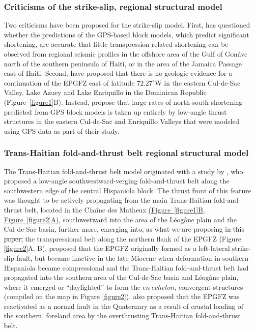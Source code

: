 \documentclass[linenumbers,draft]{agujournal}
\begin{document}
\subsubsection{Criticisms of the strike-slip, regional structural model}
Two criticisms have been proposed for the strike-slip model. First, \citet{corbeau2016transpressive} has questioned whether the predictions of the GPS-based block models, which predict significant shortening, are accurate that little transpression-related shortening can be observed from regional seismic profiles in the offshore area of the Gulf of Gon\^ave north of the southern peninsula of Haiti, or in the area of the Jamaica Passage east of Haiti. Second, \citet{symithe2016present} have proposed that there is no geologic evidence for a continuation of the EPGFZ east of latitude $72.27^{\circ}$W in the eastern Cul-de-Sac Valley, Lake Azuey and Lake Enriquillo in the Dominican Republic (Figure~\ref{figure1}B). Instead, \citet{symithe2016present} propose that large rates of north-south shortening predicted from GPS block models is taken up entirely by low-angle thrust structures in the eastern Cul-de-Sac and Enriquillo Valleys that were modeled using GPS data as part of their study.

\subsubsection{Trans-Haitian fold-and-thrust belt regional structural model}
The Trans-Haitian fold-and-thrust belt model originated with a study by \citet{pubellier2000plate}, who proposed a low-angle southwestward-verging fold-and-thrust belt along the southwestern edge of the central Hispaniola block. The thrust front of this feature was thought to be actively propagating from the main Trans-Haitian fold-and-thrust belt, located in the Cha\^ine des Matheux \underline{(Figure~\ref{figure1}B, Figure~\ref{figure2}A)}, southwestward into the area of the L\'eog\^ane plain and the Cul-de-Sac basin, further more, emerging into\st{, as what we are proposing in this paper,} the transpressional belt along the northern flank of the EPGFZ (Figure \ref{figure2}A, B). \citet{pubellier2000plate} proposed that the EPGFZ originally formed as a left-lateral strike-slip fault, but became inactive in the late Miocene when deformation in southern Hispaniola became compressional and the Trans-Haitian fold-and-thrust belt had propagated into the southern area of the Cul-de-Sac basin and L\'eog\^ane plain, where it emerged or ``daylighted'' to form the $en~echelon$, convergent structures (compiled on the map in Figure \ref{figure2}). \citet{pubellier2000plate} also proposed that the EPGFZ was reactivated as a normal fault in the Quaternary as a result of crustal loading of the southern, foreland area by the overthrusting Trans-Haitian fold-and-thrust belt. 
\end{document}

